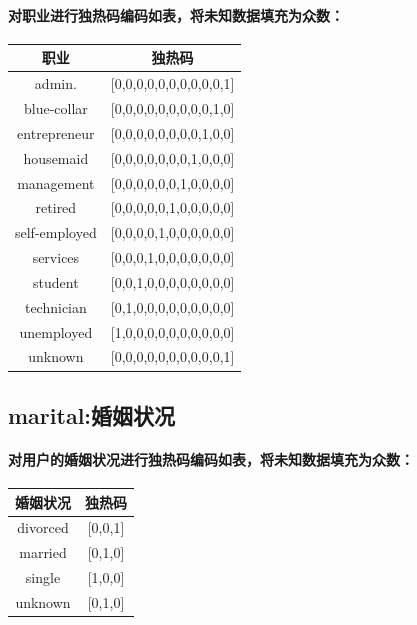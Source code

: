 \documentclass{ctexart}
\begin{document}
        \paragraph{
            对职业进行独热码编码如表，将未知数据填充为众数：
        }
        \begin{center}
            \begin{tabular}{|c|c|}
                \hline
                职业 & 独热码 \\
                \hline
                admin.        &[0,0,0,0,0,0,0,0,0,0,1]  \\
                \hline
                blue-collar   &[0,0,0,0,0,0,0,0,0,1,0]  \\
                \hline
                entrepreneur  &[0,0,0,0,0,0,0,0,1,0,0]  \\
                \hline
                housemaid     &[0,0,0,0,0,0,0,1,0,0,0]  \\
                \hline
                management    &[0,0,0,0,0,0,1,0,0,0,0]  \\
                \hline
                retired       &[0,0,0,0,0,1,0,0,0,0,0]  \\
                \hline
                self-employed &[0,0,0,0,1,0,0,0,0,0,0]  \\
                \hline
                services      &[0,0,0,1,0,0,0,0,0,0,0]  \\
                \hline
                student       &[0,0,1,0,0,0,0,0,0,0,0]  \\
                \hline
                technician    &[0,1,0,0,0,0,0,0,0,0,0]  \\
                \hline
                unemployed    &[1,0,0,0,0,0,0,0,0,0,0]  \\
                \hline
                unknown       &[0,0,0,0,0,0,0,0,0,0,1]  \\
                \hline
            \end{tabular}
        \end{center}
        \subsection{marital:婚姻状况}
        \paragraph{
            对用户的婚姻状况进行独热码编码如表，将未知数据填充为众数：
        }
        \begin{center}
            \begin{tabular}{|c|c|}
                \hline
                婚姻状况 & 独热码 \\
                \hline
                divorced  &[0,0,1]\\
                \hline
                married   &[0,1,0]\\
                \hline
                single    &[1,0,0]\\
                \hline
                unknown   &[0,1,0]\\
                \hline
            \end{tabular}
        \end{center}
\end{document}
